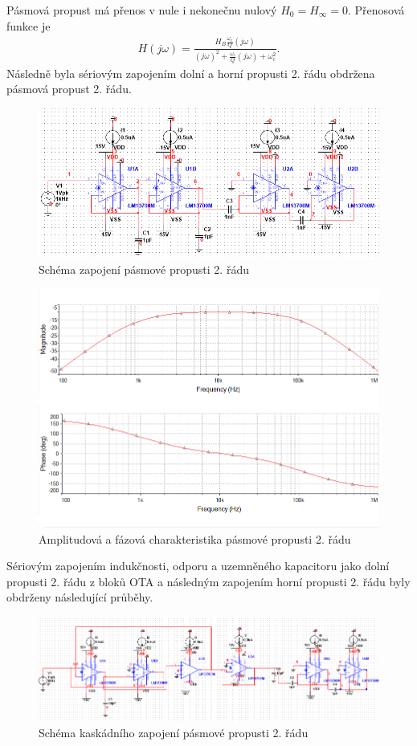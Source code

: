 \documentclass[twoside]{article}
\begin{document}
\noindent Pásmová propust má přenos v nule i nekonečnu nulový $H_{0} = H_{\infty} = 0$. Přenosová funkce je
\begin{align}
H(j\omega) = \frac{H_{B} \frac{\omega _c}{Q} (j\omega) }{(j\omega)^2 + \frac{\omega _c}{Q}(j\omega) + \omega _c ^2}.
\end{align}
\noindent Následně byla sériovým zapojením dolní a horní propusti 2. řádu obdržena pásmová propust 2. řádu.
\begin{figure}[H]
\centering
\includegraphics[scale=0.75]{16064.png}
\caption{Schéma zapojení pásmové propusti 2. řádu}
\end{figure}
\begin{figure}[H]
\centering
\includegraphics[scale=0.75]{16065.png}
\caption{Amplitudová a fázová charakteristika pásmové propusti 2. řádu}
\end{figure}
\noindent Sériovým zapojením indukčnosti, odporu a uzemněného kapacitoru jako dolní propusti 2. řádu z bloků OTA a následným zapojením horní propusti 2. řádu byly obdrženy následující průběhy.
\begin{figure}[H]
\centering
\includegraphics[scale=0.75]{lrcbandpass.png}
\caption{Schéma kaskádního zapojení pásmové propusti 2. řádu}
\end{figure}
\end{document}
